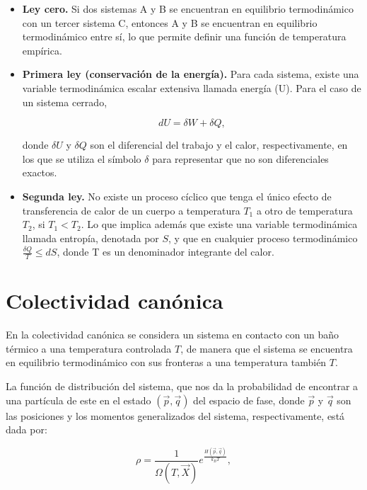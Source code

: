 \documentclass[letterpaper,12pt,oneside]{book}
\begin{document}
	\begin{itemize}
		\item \textbf{Ley cero.} Si dos sistemas A y B se encuentran en equilibrio termodin\'amico con un tercer sistema C, entonces A y B se encuentran en equilibrio termodin\'amico entre s\'i, lo que permite definir una funci\'on de temperatura emp\'irica.
		
		\item \textbf{Primera ley (conservaci\'on de la energ\'ia).} Para cada sistema, existe una variable termodin\'amica escalar extensiva llamada energ\'ia (U). Para el caso de un sistema cerrado, 
		
		\begin{equation}
			dU = \delta W + \delta Q, 
		\end{equation}
		
		\noindent donde $\delta U$ y $\delta Q$ son el diferencial del trabajo y el calor, respectivamente, en los que se utiliza el s\'imbolo $\delta$ para representar que no son diferenciales exactos.
		
		\item \textbf{Segunda ley. } No existe un proceso c\'iclico que tenga el \'unico efecto de transferencia de calor de un cuerpo a temperatura $T_1$ a otro de temperatura $T_2$, si $T_1 < T_2$. Lo que implica adem\'as que existe una variable termodin\'amica llamada entrop\'ia, denotada por $S$, y que en cualquier proceso termodin\'amico $ \frac{\delta Q}{T} \leq dS$, donde T es un denominador integrante del calor. 
	\end{itemize}
	
	\section{Colectividad can\'onica}
	
	En la colectividad can\'onica se considera un sistema en contacto con un baño t\'ermico a una temperatura controlada $T$, de manera que el sistema se encuentra en equilibrio termodin\'amico con sus fronteras a una temperatura tambi\'en $T$. 
	
	La funci\'on de distribuci\'on del sistema, que nos da la probabilidad de encontrar a una part\'icula de este en el estado $(\vec{p},\vec{q})$ del espacio de fase, donde $\vec{p}$ y $\vec{q}$  son las posiciones y los momentos generalizados del sistema, respectivamente, est\'a dada por:
	
	\begin{equation}
		\rho = \frac{1}{\Omega(T, \vec{X})} e^{\frac{H(\vec{p}, \vec{q})}{k_B T}},
	\end{equation}
	
\end{document}
